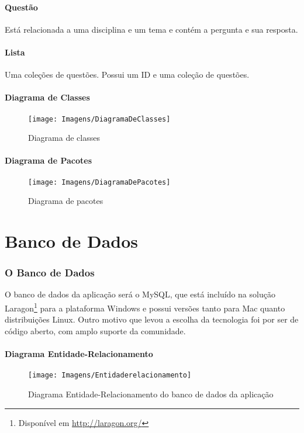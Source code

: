 \documentclass[12pt,oneside,a4paper,article]{abntex2}
\begin{document}
		\subsection{Questão}
			Está relacionada a uma disciplina e um tema e contém a pergunta e sua resposta.
	
		\subsection{Lista}
			Uma coleções de questões. Possui um ID e uma coleção de questões.
		
		\subsection{Diagrama de Classes}
			\begin{figure}[h]
				\centering
				\texttt{[image: Imagens/DiagramaDeClasses]}
				\caption{Diagrama de classes}
				\label{fig:diagramaclasses}
			\end{figure}
			
		\pagebreak
		
		\subsection{Diagrama de Pacotes}
		\begin{figure}[h]
			\centering
			\texttt{[image: Imagens/DiagramaDePacotes]}
			\caption{Diagrama de pacotes}
			\label{fig:diagramapacotes}
		\end{figure}
			

\part{Banco de Dados}
	\section{O Banco de Dados}
		O banco de dados da aplicação será o MySQL, que está incluído na solução Laragon\footnote{Disponível em \url{http://laragon.org/}} para a plataforma Windows e possui versões tanto para Mac quanto distribuições Linux. Outro motivo que levou a escolha da tecnologia foi por ser de código aberto, com amplo suporte da comunidade.
		
		\subsection{Diagrama Entidade-Relacionamento}
			\begin{figure}[h]
				\centering
				\texttt{[image: Imagens/Entidaderelacionamento]}
				\caption{Diagrama Entidade-Relacionamento do banco de dados da aplicação}
				\label{fig:Entidaderelacionamento}
			\end{figure}
	
\end{document}
